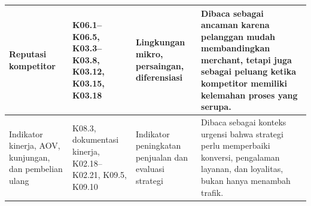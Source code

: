 \begin{xltabular}{\textwidth}{|L{2.7cm}|Y|L{2.75cm}|L{3.25cm}|}
Reputasi kompetitor & K06.1--K06.5, K03.3--K03.8, K03.12, K03.15, K03.18 & Lingkungan mikro, persaingan, diferensiasi & Dibaca sebagai ancaman karena pelanggan mudah membandingkan merchant, tetapi juga sebagai peluang ketika kompetitor memiliki kelemahan proses yang serupa. \\ \hline
Indikator kinerja, AOV, kunjungan, dan pembelian ulang & K08.3, dokumentasi kinerja, K02.18--K02.21, K09.5, K09.10 & Indikator peningkatan penjualan dan evaluasi strategi & Dibaca sebagai konteks urgensi bahwa strategi perlu memperbaiki konversi, pengalaman layanan, dan loyalitas, bukan hanya menambah trafik. \\ \hline
\end{xltabular}
\endgroup
